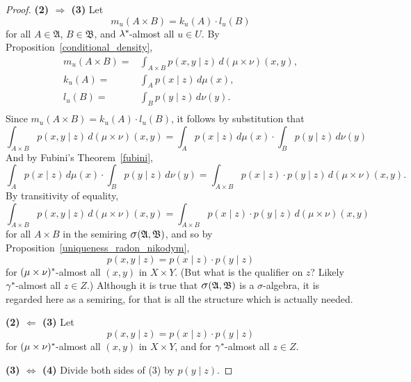 \documentclass[
twoside=true,
paper=letter,
fontsize=9pt,
pagesize=auto,
leqno,
openany,
headsepline,
overfullrule,
]{scrbook}
\theoremstyle{plain}
\theoremstyle{plain}
\theoremstyle{definition}
\theoremstyle{bfnoteitalic}
\theoremstyle{bfnoteroman}
\newcommand{\sigalg}[1]{\mathfrak{#1}}
\newcommand{\sagb}{\mathop{\hbox{\large{$\sigma$}}}\nolimits}
\newcommand{\textsigma}{\hbox{\large{$\sigma$}}\kern-1pt}
\newcommand{\sigmaalgebra}{\sigalg{A}}
\newcommand{\sigmaalgebraii}{\sigalg{B}}
\newcommand{\productsig}[2]{\sagb(#1,#2)}
\newcommand{\kernast}{\ast\kern-1pt}
\newcommand{\funck}{k}
\newcommand{\funcl}{l}
\newcommand{\funcm}{m}
\newcommand{\measurespace}{X}
\newcommand{\measurespaceii}{Y}
\newcommand{\measurespaceiii}{Z}
\newcommand{\mspaceelt}{x}
\newcommand{\mspaceeltii}{y}
\newcommand{\mspaceeltiii}{z}
\newcommand{\measmu}{\mu}
\newcommand{\measnu}{\nu}
\newcommand{\measlambda}{\lambda}
\newcommand{\seti}{A}
\newcommand{\setii}{B}
\newcommand{\uspace}{U}%
\newcommand{\uspaceelt}{u}
\newcommand{\marginalthree}{\gamma}
\begin{document}
\begin{proof}
\textbf{(2) $\Rightarrow$ (3)}\quad
Let
\[
\funcm_\uspaceelt
(\seti\times\setii)
=
\funck_\uspaceelt(\seti)
\cdot
\funcl_\uspaceelt(\setii)
\]
for all $\seti\in\sigmaalgebra$, $\setii\in\sigmaalgebraii$, and $\measlambda^\kernast$\hyp{}almost all
$\uspaceelt\in\uspace$.
By Proposition~\ref{conditional_density},
\begin{align*}
\funcm_\uspaceelt
(\seti\times\setii)
= &
\int_{\seti\times\setii}
p(\mspaceelt,\mspaceeltii\mid\mspaceeltiii)
\,d(\measmu\times\measnu)(\mspaceelt,\mspaceeltii),
\\
\funck_\uspaceelt
(\seti)
= &
\int_\seti p(\mspaceelt\mid\mspaceeltiii)
\, d\measmu(\mspaceelt),
\\
\funcl_\uspaceelt
(\setii)
= &
\int_\setii p(\mspaceeltii\mid\mspaceeltiii)
\, d\measnu(\mspaceeltii).
\\
\end{align*}
Since
$\funcm_\uspaceelt
(\seti\times\setii)
=
\funck_\uspaceelt(\seti)
\cdot
\funcl_\uspaceelt(\setii)$, it follows by substitution that
\[
\int_{\seti\times\setii}
p(\mspaceelt,\mspaceeltii\mid\mspaceeltiii)
\,d(\measmu\times\measnu)(\mspaceelt,\mspaceeltii)
=
\int_\seti p(\mspaceelt\mid\mspaceeltiii)
\, d\measmu(\mspaceelt)
\cdot
\int_\setii p(\mspaceeltii\mid\mspaceeltiii)
\, d\measnu(\mspaceeltii)
\]
And by Fubini's Theorem~\ref{fubini},
\[
\int_\seti p(\mspaceelt\mid\mspaceeltiii)
\, d\measmu(\mspaceelt)
\cdot
\int_\setii p(\mspaceeltii\mid\mspaceeltiii)
\, d\measnu(\mspaceeltii)
=
\int_{\seti\times\setii}
p(\mspaceelt\mid\mspaceeltiii)\cdot
p(\mspaceeltii\mid\mspaceeltiii)
\, d(\measmu\times\measnu)(\mspaceelt,\mspaceeltii).
\]
By transitivity of equality,
\[
\int_{\seti\times\setii}
p(\mspaceelt,\mspaceeltii\mid\mspaceeltiii)
\,d(\measmu\times\measnu)(\mspaceelt,\mspaceeltii)
=
\int_{\seti\times\setii}
p(\mspaceelt\mid\mspaceeltiii)\cdot
p(\mspaceeltii\mid\mspaceeltiii)
\, d(\measmu\times\measnu)(\mspaceelt,\mspaceeltii)
\]
for all $\seti\times\setii$ in the semiring
$\productsig{\sigmaalgebra}{\sigmaalgebraii}$, and so
by Proposition~\ref{uniqueness_radon_nikodym},
\[
p(\mspaceelt,\mspaceeltii\mid\mspaceeltiii)
=
p(\mspaceelt\mid\mspaceeltiii)\cdot
p(\mspaceeltii\mid\mspaceeltiii)
\]
for $(\measmu\times\measnu)^\kernast$\hyp{}almost all $(\mspaceelt,\mspaceeltii)$ in
$\measurespace\times\measurespaceii$.
(But what is the qualifier on $\mspaceeltiii$? Likely
$\marginalthree^\kernast$\hyp{}almost all
$\mspaceeltiii\in\measurespaceiii$.)
Although it is true that
$\productsig{\sigmaalgebra}{\sigmaalgebraii}$
is a \textsigma\hyp{}algebra, it is regarded here as a semiring, for that is all the structure which is actually needed.

\textbf{(2) $\Leftarrow$ (3)}\quad
Let
\[
p(\mspaceelt,\mspaceeltii\mid\mspaceeltiii)
=
p(\mspaceelt\mid\mspaceeltiii)\cdot
p(\mspaceeltii\mid\mspaceeltiii)
\]
for $(\measmu\times\measnu)^\kernast$\hyp{}almost all $(\mspaceelt,\mspaceeltii)$ in
$\measurespace\times\measurespaceii$, and for
$\marginalthree^\kernast$\hyp{}almost all
$\mspaceeltiii\in\measurespaceiii$.

\textbf{(3) $\Leftrightarrow$ (4)}\quad
Divide both sides of (3) by $p(\mspaceeltii\mid\mspaceeltiii)$.
\end{proof}
\end{document}
